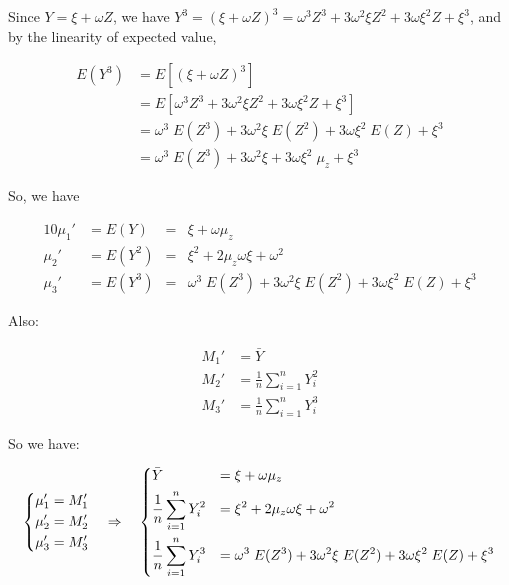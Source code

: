 \documentclass{article}
\begin{document}
Since $Y = \xi + \omega Z$, we have $Y^3 = (\xi + \omega Z)^3 = \omega^3 Z^3 + 3 \omega^2 \xi Z^2 +
3 \omega \xi^2 Z + \xi^3$, and by the linearity of expected value,

\begin{align}
  E(Y^3) &= E [(\xi + \omega Z)^3] \nonumber \\
  &= E[\omega^3 Z^3 + 3 \omega^2 \xi Z^2 + 3 \omega \xi^2 Z + \xi^3] \nonumber \\
  &= \omega^3\;E(Z^3) + 3 \omega^2 \xi\;E(Z^2) + 3 \omega \xi^2\;E(Z) + \xi^3 \nonumber \\
  &= \omega^3\;E(Z^3) + 3 \omega^2 \xi + 3 \omega \xi^2\;\mu_z + \xi^3
\end{align}

So, we have

\begin{alignat}{10}
  \mu_1' &= E(Y) &=& \xi + \omega \mu_z \nonumber \\
  \mu_2' &= E(Y^2) &=& \xi^2 + 2 \mu_z \omega \xi + \omega^2 \\
  \mu_3' &= E(Y^3) &=& \omega^3\;E(Z^3) + 3 \omega^2 \xi\;E(Z^2) + 3 \omega \xi^2\;E(Z) + \xi^3 \nonumber
\end{alignat}

Also:

\begin{align}
  M_1' &= \bar Y \nonumber \\
  M_2' &= \frac{1}{n} \sum_{i=1}^n Y_i^2 \\
  M_3' &= \frac{1}{n} \sum_{i=1}^n Y_i^3 \nonumber
\end{align}

So we have:

\begin{equation*}
  \begin{dcases}
    \mu_1' = M_1' \\
    \mu_2' = M_2' \\
    \mu_3' = M_3' \\
  \end{dcases}
  \quad \Rightarrow \quad
  \begin{dcases}
    \bar Y &= \xi + \omega \mu_z \\
    \frac{1}{n} \sum_{i=1}^n Y_i^2 &= \xi^2 + 2 \mu_z \omega \xi + \omega^2 \\
    \frac{1}{n} \sum_{i=1}^n Y_i^3 &= \omega^3\;E(Z^3) + 3 \omega^2 \xi\;E(Z^2) + 3 \omega \xi^2\;E(Z) + \xi^3
  \end{dcases}
\end{equation*}
\end{document}
